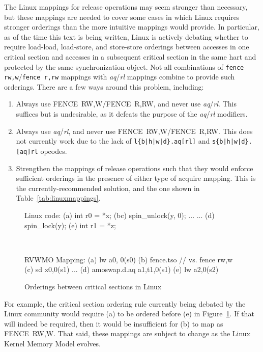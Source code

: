 The Linux mappings for release operations may seem stronger than necessary, but these mappings are needed to cover some cases in which Linux requires stronger orderings than the more intuitive mappings would provide.
In particular, as of the time this text is being written, Linux is actively debating whether to require load-load, load-store, and store-store orderings between accesses in one critical section and accesses in a subsequent critical section in the same hart and protected by the same synchronization object.
Not all combinations of {\tt fence rw,w}/{\tt fence r,rw} mappings with {\em aq}/{\em rl} mappings combine to provide such orderings.
There are a few ways around this problem, including:
\begin{enumerate}
  \item Always use FENCE~RW,W/FENCE~R,RW, and never use {\em aq}/{\em rl}.  This suffices but is undesirable, as it defeats the purpose of the {\em aq}/{\em rl} modifiers.
  \item Always use {\em aq}/{\em rl}, and never use FENCE~RW,W/FENCE~R,RW.  This does not currently work due to the lack of {\tt l\{b|h|w|d\}.aq[rl]} and {\tt s\{b|h|w|d\}.[aq]rl} opcodes.
  \item Strengthen the mappings of release operations such that they would enforce sufficient orderings in the presence of either type of acquire mapping.  This is the currently-recommended solution, and the one shown in Table~\ref{tab:linuxmappings}.
\end{enumerate}

\begin{figure}[h!]
  \centering\small
  \begin{verbbox}
Linux code:
(a)  int r0 = *x;
(bc) spin_unlock(y, 0);
     ...
     ...
(d)  spin_lock(y);
(e)  int r1 = *z;
  \end{verbbox}
  \theverbbox
  ~~~~~~~~~~
  \begin{verbbox}
RVWMO Mapping:
(a) lw           a0, 0(s0)
(b) fence.tso  // vs. fence rw,w
(c) sd           x0,0(s1)
    ...
(d) amoswap.d.aq a1,t1,0(s1)
(e) lw           a2,0(s2)
  \end{verbbox}
  \theverbbox
  \caption{Orderings between critical sections in Linux}
  \label{fig:litmus:lkmm_ll}
\end{figure}

For example, the critical section ordering rule currently being debated by the Linux community would require (a) to be ordered before (e) in Figure~\ref{fig:litmus:lkmm_ll}.
If that will indeed be required, then it would be insufficient for (b) to map as FENCE~RW,W.
That said, these mappings are subject to change as the Linux Kernel Memory Model evolves.


